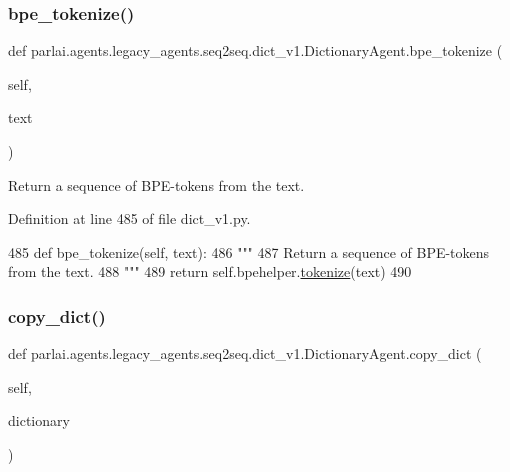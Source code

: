 \subsubsection{\texorpdfstring{bpe\+\_\+tokenize()}{bpe\_tokenize()}}
{\footnotesize\ttfamily def parlai.\+agents.\+legacy\+\_\+agents.\+seq2seq.\+dict\+\_\+v1.\+Dictionary\+Agent.\+bpe\+\_\+tokenize (\begin{DoxyParamCaption}\item[{}]{self,  }\item[{}]{text }\end{DoxyParamCaption})}

\begin{DoxyVerb}Return a sequence of BPE-tokens from the text.
\end{DoxyVerb}
 

Definition at line 485 of file dict\+\_\+v1.\+py.


\begin{DoxyCode}
485     \textcolor{keyword}{def }bpe\_tokenize(self, text):
486         \textcolor{stringliteral}{"""}
487 \textcolor{stringliteral}{        Return a sequence of BPE-tokens from the text.}
488 \textcolor{stringliteral}{        """}
489         \textcolor{keywordflow}{return} self.bpehelper.\hyperlink{namespaceparlai_1_1agents_1_1tfidf__retriever_1_1build__tfidf_a1fdb457e98eb4e4c26047e229686a616}{tokenize}(text)
490 
\end{DoxyCode}
\mbox{\label{classparlai_1_1agents_1_1legacy__agents_1_1seq2seq_1_1dict__v1_1_1DictionaryAgent_ace20feec59a305f29680ba6167eda2f6}} 
\subsubsection{\texorpdfstring{copy\+\_\+dict()}{copy\_dict()}}
{\footnotesize\ttfamily def parlai.\+agents.\+legacy\+\_\+agents.\+seq2seq.\+dict\+\_\+v1.\+Dictionary\+Agent.\+copy\+\_\+dict (\begin{DoxyParamCaption}\item[{}]{self,  }\item[{}]{dictionary }\end{DoxyParamCaption})}

